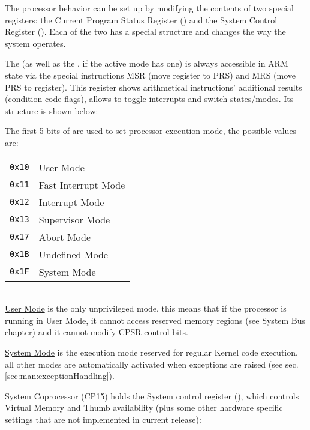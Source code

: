 
The processor behavior can be set up by modifying the contents of two special registers: the Current Program Status Register () and the System Control Register ().
Each of the two has a special structure and changes the way the system operates.


The  (as well as the , if the active mode has one) is always accessible in ARM state via the special instructions MSR (move register to PRS) and MRS (move PRS to register). This register shows arithmetical instructions' additional results (condition code flags), allows to toggle interrupts and switch states/modes. Its structure is shown below:




The first 5 bits of  are used to set processor execution mode, the possible values are:
\\

\begin{tabular}{r|l}
\texttt{0x10} & User Mode \\
\texttt{0x11} & Fast Interrupt Mode \\
\texttt{0x12} & Interrupt Mode \\
\texttt{0x13} & Supervisor Mode \\
\texttt{0x17} & Abort Mode \\
\texttt{0x1B} & Undefined Mode \\
\texttt{0x1F} & System Mode \\
\end{tabular}
\\

\uline{User Mode} is the only unprivileged mode, this means that if the processor is running in User Mode, it cannot access reserved memory regions (see System Bus chapter) and it cannot modify CPSR control bits.

\uline{System Mode} is the execution mode reserved for regular Kernel code execution, all other modes are automatically activated when exceptions are raised (see sec. \ref{sec:man:exceptionHandling}).

\label{sec:manual:systemControlRegister}

System Coprocessor (CP15) holds the System control register (), which controls Virtual Memory and Thumb availability (plus some other hardware specific settings that are not implemented in current release):


